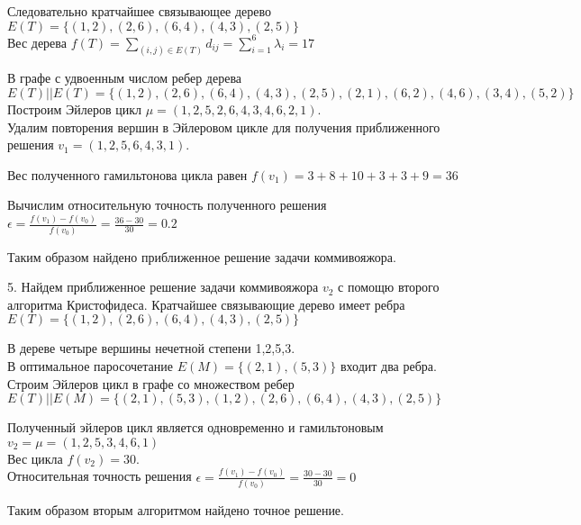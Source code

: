\documentclass[a4paper,10pt]{article} %
\begin{document}
Следовательно кратчайшее связывающее дерево
$E(T) = \{ (1,2), (2,6), (6,4), (4,3),(2,5) \} $ \\
Вес дерева 
$f(T) = \sum_{(i,j) \in E(T)} d_{ij}  = \sum_{i=1}^{6} \lambda_i = 17 $

\bigskip
\bigskip

В графе с удвоенным числом ребер дерева \\
$ E(T) || E(T) = \{ 
 (1,2), (2,6), (6,4),(4,3),(2,5)
,(2,1), (6,2), (4,6),(3,4),(5,2)
\}$ \\
Построим Эйлеров цикл $\mu = (1,2,5,2,6,4,3,4,6,2,1)$. \\
Удалим повторения вершин в Эйлеровом цикле для получения приближенного решения $v_1 = (1,2,5,6,4,3,1)$. 

\smallskip 

Вес полученного гамильтонова цикла равен 
$f(v_1) = 3 + 8 + 10 + 3 + 3 + 9 = 36 $

Вычислим относительную точность полученного решения
$ \epsilon = \frac{f(v_1) - f(v_0)}{f(v_0)} = \frac{36 - 30}{30} = 0.2 $

\smallskip

Таким образом найдено приближенное решение задачи коммивояжора.

\bigskip

5. \quad Найдем приближенное решение задачи коммивояжора $v_2$ с помощю второго алгоритма Кристофидеса.
Кратчайшее связывающие дерево имеет ребра
$E(T) = \{ (1,2), (2,6), (6,4), (4,3),(2,5) \}  $

В дереве четыре вершины нечетной степени 1,2,5,3. \\
В оптимальное паросочетание $E(M) = \{(2,1), (5,3)\}$ входит два ребра.
Строим Эйлеров цикл в графе со множеством ребер \\
$E(T) || E(M) = \{ (2,1),(5,3),(1,2),(2,6), (6,4), (4,3),(2,5) \} $

\smallskip 

Полученный эйлеров цикл является одновременно и гамильтоновым
$v_2 = \mu = (1,2,5,3,4,6,1) $ \\
Вес цикла $f(v_2) = 30$. \\
Относительная точность решения $ \epsilon = \frac{f(v_1) - f(v_0)}{f(v_0)} = \frac{30 - 30}{30} = 0$ \\

\smallskip

Таким образом вторым алгоритмом найдено точное решение.
\end{document}
